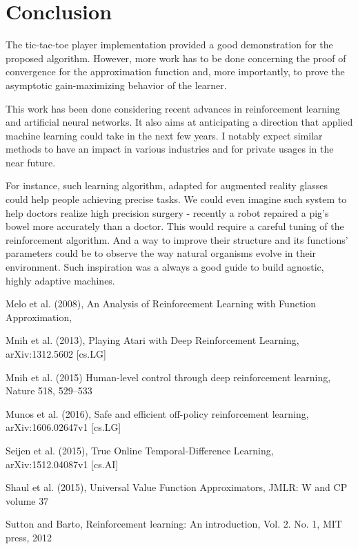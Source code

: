 \documentclass[scrartcl, 10.5 pt, conference]{ieeeconf}
\begin{document}
\section{Conclusion}

The tic-tac-toe player implementation provided a good demonstration for the proposed algorithm. However, more work has to be done concerning the proof of convergence for the approximation function and, more importantly, to prove the asymptotic gain-maximizing behavior of the learner.

This work has been done considering recent advances in reinforcement learning and artificial neural networks. It also aims at anticipating a direction that applied machine learning could take in the next few years. I notably expect similar methods to have an impact in various industries and for private usages in the near future.

For instance, such learning algorithm, adapted for augmented reality glasses could help people achieving precise tasks. We could even imagine such system to help doctors realize high precision surgery - recently a robot repaired a pig's bowel more accurately than a doctor. This would require a careful tuning of the reinforcement algorithm. And a way to improve their structure and its functions' parameters could be to observe the way natural organisms evolve in their environment. Such inspiration was a always a good guide to build agnostic, highly adaptive machines.

\addtolength{\textheight}{-12cm}   %

\begin{thebibliography}{99}

 Melo et al. (2008), An Analysis of Reinforcement Learning with Function Approximation, 

 Mnih et al. (2013), Playing Atari with Deep Reinforcement Learning, arXiv:1312.5602 [cs.LG]

 Mnih et al. (2015) Human-level control through deep reinforcement learning, Nature 518, 529–533

 Munos et al. (2016), Safe and efficient off-policy reinforcement learning, arXiv:1606.02647v1 [cs.LG]

 Seijen et al. (2015), True Online Temporal-Difference Learning, arXiv:1512.04087v1 [cs.AI]

 Shaul et al. (2015), Universal Value Function Approximators,  JMLR: W and CP volume 37

 Sutton and Barto, Reinforcement learning: An introduction, Vol. 2. No. 1, MIT press, 2012

\end{thebibliography}
\end{document}
